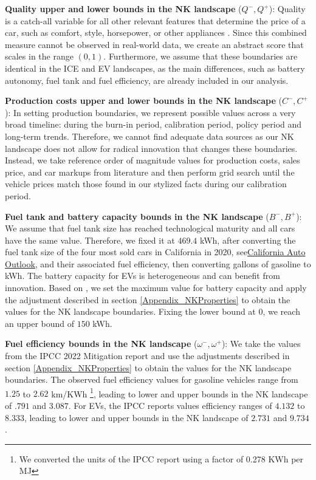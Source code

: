 \documentclass[12pt]{article}
\begin{document}
	\textbf{Quality upper and lower bounds in the NK landscape} ($Q^-,Q^+$): Quality is a catch-all variable for all other relevant features that determine the price of a car, such as comfort, style, horsepower, or other appliances \citep{ostli2017generic,Grieco2024MarketPower}. Since this combined measure cannot be observed in real-world data, we create an abstract score that scales in the range $(0,1)$. Furthermore, we assume that these boundaries are identical in the ICE and EV landscapes, as the main differences, such as battery autonomy, fuel tank and fuel efficiency, are already included in our analysis.
	
	\textbf{Production costs upper and lower bounds in the NK landscape} ($C^-,C^+$): 
	In setting production boundaries, we represent possible values across a very broad timeline: during the burn-in period, calibration period, policy period and long-term trends. Therefore, we cannot find adequate data sources as our NK landscape does not allow for radical innovation that changes these boundaries. Instead, we take reference order of magnitude values for production costs, sales price, and car markups from literature \citep{konig2021overview, woody2024electric, Grieco2024MarketPower} and then perform grid search until the vehicle prices match those found in our stylized facts during our calibration period.
	
	\textbf{Fuel tank and battery capacity bounds in the NK landscape} ($B^-,B^+$): We assume that fuel tank size has reached technological maturity and all cars have the same value. Therefore, we fixed it at $469.4$ kWh, after converting the fuel tank size of the four most sold cars in California in 2020, see\href{https://www.cncda.org/wp-content/uploads/Cal-Covering-4Q-20.pdf}{California Auto Outlook}, and their associated fuel efficiency, then converting gallons of gasoline to kWh. The battery capacity for EVs is heterogeneous and can benefit from innovation. Based on \citep{Schmuch2018}, we set the maximum value for battery capacity and apply the adjustment described in section \ref{Appendix_NKProperties} to obtain the values for the NK landscape boundaries. Fixing the lower bound at $0$, we reach an upper bound of $150$ kWh.
	
	\textbf{Fuel efficiency bounds in the NK landscape} ($\omega^-,\omega^+$): We take the values from the IPCC 2022 Mitigation report \citep[Appendix 10.2]{ipcc2022transport} and use the adjustments described in section \ref{Appendix_NKProperties} to obtain the values for the NK landscape boundaries. The observed fuel efficiency values for gasoline vehicles range from $1.25$ to $2.62$ km/KWh \footnote{We converted the units of the IPCC report using a factor of 0.278 KWh per MJ}, leading to lower and upper bounds in the NK landscape of $.791$ and $3.087$. For EVs, the IPCC reports values efficiency ranges of $4.132$ to $8.333$, leading to lower and upper bounds in the NK landscape of $2.731$ and $9.734$. 
    
\end{document}
